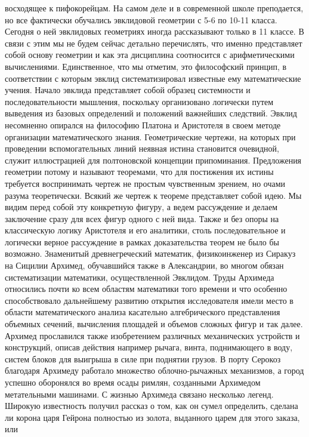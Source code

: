 восходящее к пифокорейцам. На самом деле и в современной школе преподается, но
все фактически обучались эвклидовой геометрии с 5-6 по 10-11 класса. Сегодня о
ней эвклидовых геометриях иногда рассказывают только в 11 классе. В связи с этим
мы не будем сейчас детально перечислять, что именно представляет собой основу
геометрии и как эта дисциплина соотносится с арифметическими вычислениями.
Единственное, что мы отметим, это философский принцип, в соответствии с которым
эвклид систематизировал известные ему математические учения. Начало эвклида
представляет собой образец системности и последовательности мышления, поскольку
организовано логически путем выведения из базовых определений и положений
важнейших следствий. Эвклид несомненно опирался на философию Платона и
Аристотеля в своем методе организации математического знания. Геометрические
чертежи, на которых при проведении вспомогательных линий неявная истина
становится очевидной, служит иллюстрацией для полтоновской концепции
припоминания. Предложения геометрии потому и называют теоремами, что для
постижения их истины требуется воспринимать чертеж не простым чувственным
зрением, но очами разума теоретически. Всякий же чертеж к теореме представляет
собой идею. Мы видим перед собой эту конкретную фигуру, а ведем рассуждение и
делаем заключение сразу для всех фигур одного с ней вида. Также и без опоры на
классическую логику Аристотеля и его аналитики, столь последовательное и
логически верное рассуждение в рамках доказательства теорем не было бы возможно.
Знаменитый древнегреческий математик, физикоинженер из Сиракуз на Сицилии
Архимед, обучавшийся также в Александрии, во многом обязан систематизации
математики, осуществленной Эвклидом. Труды Архимеда относились почти ко всем
областям математики того времени и что особенно способствовало дальнейшему
развитию открытия исследователя имели место в области математического анализа
касательно алгебрического представления объемных сечений, вычисления площадей и
объемов сложных фигур и так далее. Архимед прославился также изобретением
различных механических устройств и конструкций, описав действия например рычага,
винта, поднимающего в воду, систем блоков для выигрыша в силе при поднятии
грузов. В порту Серокоз благодаря Архимеду работало множество облочно-рычажных
механизмов, а город успешно оборонялся во время осады римлян, созданными
Архимедом метательными машинами. С жизнью Архимеда связано несколько легенд.
Широкую известность получил рассказ о том, как он сумел определить, сделана ли
корона царя Гейрона полностью из золота, выданного царем для этого заказа, или
